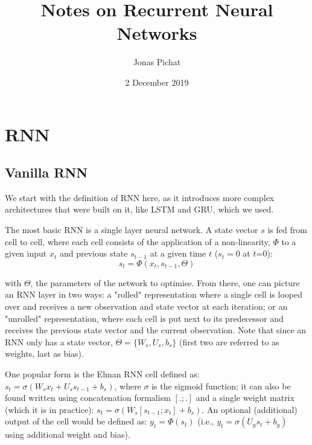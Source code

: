 \documentclass{article}
\begin{document}
\title{Notes on Recurrent Neural Networks}
\author{Jonas Pichat}
\date{2 December 2019}
\maketitle


\section{RNN}
\label{rnn}

\subsection{Vanilla RNN}
We start with the definition of RNN here, as it introduces more complex architectures that were built on it, like LSTM and GRU, which we used.

The most basic RNN is a single layer neural network. A state vector $s$ is fed from cell to cell, where each cell consists of the application of a non-linearity, $\Phi$ to a given input $x_t$ and previous state $s_{t-1}$ at a given time $t$ ($s_t=0$ at $t$=0):
\begin{equation}
  \label{rnn}
  s_t=\Phi(x_t, s_{t-1}, \Theta)
\end{equation}

with $\Theta$, the parameters of the network to optimise. From there, one can picture an RNN layer in two ways: a "rolled" representation where a single cell is looped over and receives a new observation and state vector at each iteration; or an "unrolled" representation, where each cell is put next to its predecessor and receives the previous state vector and the current observation. Note that since an RNN only has a state vector, $\Theta=\{W_s, U_s, b_s\}$ (first two are referred to as weights, last as bias).

One popular form is the Elman RNN cell defined as: $s_t=\sigma(W_s x_t + U_s s_{t-1} + b_s)$, where $\sigma$ is the sigmoid function; it can also be found written using concatenation formalism $[.;.]$ and a single weight matrix (which it is in practice): $s_t=\sigma(W_s [s_{t-1}; x_t] + b_s)$. An optional (additional) output of the cell would be defined as: $y_t=\Phi(s_t)$ (i.e., $y_t=\sigma(U_y s_t + b_y)$ using additional weight and bias).
\end{document}
